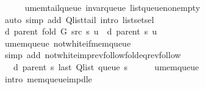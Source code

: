 \begin{isabellebody}
\ \ \ \ \isamarkupfalse%
\ u{\isacharunderscore}{\kern0pt}mem{\isacharunderscore}{\kern0pt}tail{\isacharunderscore}{\kern0pt}queue\ invar{\isacharunderscore}{\kern0pt}queue\ list{\isacharunderscore}{\kern0pt}queue{\isacharunderscore}{\kern0pt}non{\isacharunderscore}{\kern0pt}empty\isanewline
\ \ \ \ \isamarkupfalse%
\ {\isacharparenleft}{\kern0pt}auto\ simp\ add{\isacharcolon}{\kern0pt}\ Q{\isachardot}{\kern0pt}list{\isacharunderscore}{\kern0pt}tail\ intro{\isacharcolon}{\kern0pt}\ list{\isachardot}{\kern0pt}set{\isacharunderscore}{\kern0pt}sel{\isacharparenleft}{\kern0pt}{}{\isacharparenright}{\kern0pt}{\isacharparenright}{\kern0pt}\isanewline
\ \ \isamarkupfalse%
\ {\isachardoublequoteopen}d\ {\isacharparenleft}{\kern0pt}parent\ {\isacharparenleft}{\kern0pt}fold\ G\ src\ s{\isacharparenright}{\kern0pt}{\isacharparenright}{\kern0pt}\ u\ {\isacharequal}{\kern0pt}\ d\ {\isacharparenleft}{\kern0pt}parent\ s{\isacharparenright}{\kern0pt}\ u{\isachardoublequoteclose}\isanewline
\ \ \ \ \isamarkupfalse%
\ u{\isacharunderscore}{\kern0pt}mem{\isacharunderscore}{\kern0pt}queue\ not{\isacharunderscore}{\kern0pt}white{\isacharunderscore}{\kern0pt}if{\isacharunderscore}{\kern0pt}mem{\isacharunderscore}{\kern0pt}queue\isanewline
\ \ \ \ \isamarkupfalse%
\ {\isacharparenleft}{\kern0pt}simp\ add{\isacharcolon}{\kern0pt}\ not{\isacharunderscore}{\kern0pt}white{\isacharunderscore}{\kern0pt}imp{\isacharunderscore}{\kern0pt}rev{\isacharunderscore}{\kern0pt}follow{\isacharunderscore}{\kern0pt}fold{\isacharunderscore}{\kern0pt}eq{\isacharunderscore}{\kern0pt}rev{\isacharunderscore}{\kern0pt}follow{\isacharparenright}{\kern0pt}\isanewline
\ \ \isamarkupfalse%
\ \isamarkupfalse%
\ {\isachardoublequoteopen}{\isachardot}{\kern0pt}{\isachardot}{\kern0pt}{\isachardot}{\kern0pt}\ {\isasymle}\ d\ {\isacharparenleft}{\kern0pt}parent\ s{\isacharparenright}{\kern0pt}\ {\isacharparenleft}{\kern0pt}last\ {\isacharparenleft}{\kern0pt}Q{\isacharunderscore}{\kern0pt}list\ {\isacharparenleft}{\kern0pt}queue\ s{\isacharparenright}{\kern0pt}{\isacharparenright}{\kern0pt}{\isacharparenright}{\kern0pt}{\isachardoublequoteclose}\isanewline
\ \ \ \ \isamarkupfalse%
\ u{\isacharunderscore}{\kern0pt}mem{\isacharunderscore}{\kern0pt}queue\isanewline
\ \ \ \ \isamarkupfalse%
\ {\isacharparenleft}{\kern0pt}intro\ mem{\isacharunderscore}{\kern0pt}queue{\isacharunderscore}{\kern0pt}imp{\isacharunderscore}{\kern0pt}d{\isacharunderscore}{\kern0pt}le{\isacharparenright}{\kern0pt}\isanewline

\end{isabellebody}
